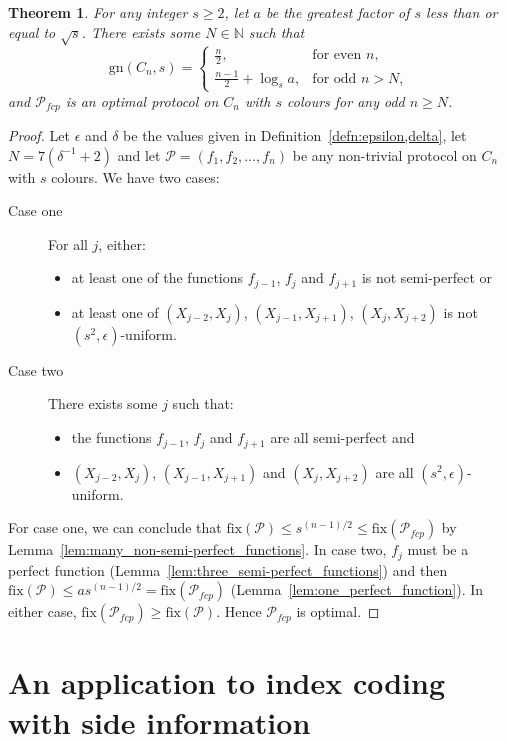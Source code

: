 \documentclass{birkjour}
\newtheorem{thm}{Theorem}[section]
\theoremstyle{indenteddefinition}
\theoremstyle{indenteddefinition}
\numberwithin{equation}{section}
\renewcommand{\Pr}{\mathcal{P}}
\newcommand{\fix}{\mbox{fix}}
\newcommand{\gn}{\mbox{gn}}
\begin{document}
\begin{thm}
\label{thm:n_large}
For any integer $s \geq 2$, let $a$ be the greatest factor of $s$ less than or equal to $\sqrt{s}$. There exists some $N \in \mathbb{N}$ such that 
$$\gn (C_n,s)=\begin{cases} \frac{n}{2}, &\mbox{for even } n , \\  \frac{n-1}{2}+\log_s a, &\mbox{for odd }n>N,   \end{cases}$$
and $\Pr_{fcp}$ is an optimal protocol on $C_n$ with $s$ colours for any odd $n \geq N$.
\end{thm}
\begin{proof}
Let $\epsilon$ and $\delta$ be the values given in Definition~\ref{defn:epsilon,delta}, let $N = 7(\delta^{-1}+2)$ and let $\Pr = (f_1,f_2, \ldots ,f_n)$ be any non-trivial protocol on $C_n$ with $s$ colours. We have two cases:
\begin{description}
\item[Case one] 
	For all $j$, either:
	\begin{itemize} 
	\item at least one of the functions $f_{j-1}$, $f_j$ and $f_{j+1}$ is not semi-perfect or 
	\item at least one of $(X_{j-2},X_j)$, $(X_{j-1},X_{j+1})$, $(X_j,X_{j+2})$ is not $(s^2,\epsilon)$-uniform. 
	\end{itemize}
\item[Case two] 
	There exists some $j$ such that: 
	\begin{itemize}
	\item the functions $f_{j-1}$, $f_j$ and $f_{j+1}$ are all semi-perfect and 
	\item $(X_{j-2},X_j)$, $(X_{j-1},X_{j+1})$ and $(X_j,X_{j+2})$ are all $(s^2,\epsilon)$-uniform.
	\end{itemize}
\end{description}
For case one, we can conclude that $\fix(\Pr) \leq s^{(n-1)/2} \leq \fix(\Pr_{fcp})$ by Lemma~\ref{lem:many_non-semi-perfect_functions}. In case two, $f_j$ must be a perfect function (Lemma~\ref{lem:three_semi-perfect_functions}) and then $\fix(\Pr) \leq as^{(n-1)/2} = \fix(\Pr_{fcp})$ (Lemma~\ref{lem:one_perfect_function}). In either case, $\fix(\Pr_{fcp}) \geq \fix(\Pr)$. Hence $\Pr_{fcp}$ is optimal.
\end{proof}






\section{An application to index coding with side information}
\label{sec:defective}
\end{document}
